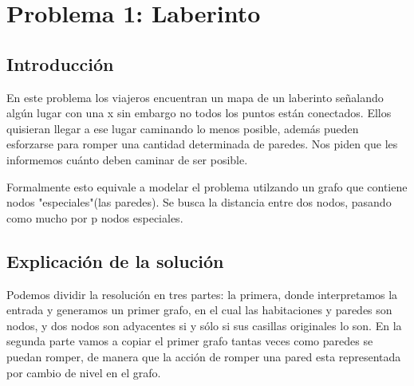\documentclass[spanish,12pt]{article}
\begin{document}
\author{Grupo  \\Alvarez Vico Jazm\'in\\Cortés Conde Titó Javier María\\Pedraza Marcelo \\ Rozenberg Uriel Jonathan}


\maketitle


\clearpage

\tableofcontents
\cleardoublepage

\section{Problema 1: Laberinto}

\subsection{Introducción}

En este problema los viajeros encuentran un mapa de un laberinto señalando algún lugar con una x sin embargo no todos los puntos están conectados. Ellos quisieran llegar a ese lugar caminando lo menos posible, además pueden esforzarse para romper una cantidad determinada de paredes. Nos piden que les informemos cuánto deben caminar de ser posible.

Formalmente esto equivale a modelar el problema utilzando un grafo que contiene nodos "especiales"(las paredes). Se busca la distancia entre dos nodos, pasando como mucho por p nodos especiales.

\subsection{Explicación de la solución}
Podemos dividir la resolución en tres partes: la primera, donde interpretamos la entrada y generamos un primer grafo, en el cual las habitaciones y paredes son nodos, y dos nodos son adyacentes si y sólo si sus casillas originales lo son. En la segunda parte vamos a copiar el primer grafo tantas veces como paredes se puedan romper, de manera que la acción de romper una pared esta representada por cambio de nivel en el grafo.  
\end{document}
